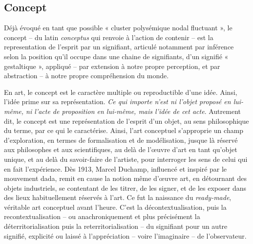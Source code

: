 \documentclass{article}
\begin{document}
\subsection*{Concept} 
\label{concept}

Déjà évoqué en tant que possible « cluster polysémique nodal fluctuant », le concept -- du latin \textit{conceptus} qui renvoie à l'action de contenir -- est la representation de l'esprit par un signifiant, articulé notamment par inférence selon la position qu’il occupe dans une chaine de signifiants, d'un signifié « gestaltique », appliqué -- par extension à notre propre perception, et par abstraction -- à notre propre compréhension du monde. 

\bigskip 

En art, le concept est le caractère multiple ou reproductible d'une idée. Ainsi, l'idée prime sur sa représentation. \textit{Ce qui importe n’est ni l’objet proposé en lui-même, ni l’acte de proposition en lui-même, mais l’idée de cet acte}. Autrement dit, le concept est une représentation de l’esprit d’un objet, au sens philosophique du terme, par ce qui le caractérise.
Ainsi, l'art conceptuel s'approprie un champ d'exploration, en termes de formalisation et de modélisation, jusque là réservé aux philosophes et aux scientifiques, au delà de l'œuvre d'art en tant qu'objet unique, et au delà du savoir-faire de l'artiste, pour interroger les sens de celui qui en fait l'expérience.
Dès 1913, Marcel Duchamp, influencé et inspiré par le mouvement dada, remit en cause la notion même d'œuvre art, en détournant des objets industriels, se contentant de les titrer, de les signer, et de les exposer dans des lieux habituellement réservés à l'art. Ce fut la naissance du \textit{ready-made}, véritable art conceptuel avant l'heure. C'est la décontextualisation, puis la recontextualisation -- ou anachroniquement et plus précisément la déterritorialisation puis la reterritorialisation -- du signifiant pour un autre signifié, explicité ou laissé à l'appréciation -- voire l'imaginaire -- de l'observateur. 
\end{document}

